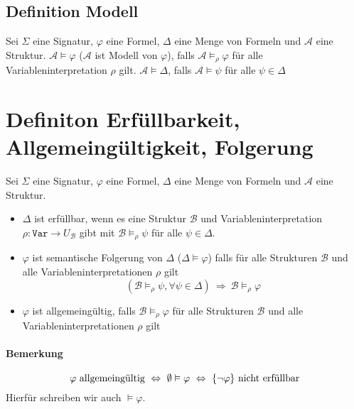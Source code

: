 \documentclass[12pt,a4paper]{report}
\newcommand{\ra}{\rightarrow}
\newcommand{\RA}{\Rightarrow}
\newcommand{\red}[1]{\textcolor[rgb]{0.9,0.2,0.2}{#1}}
\newcommand{\blue}[1]{\textcolor[rgb]{0.2,0.2,1}{#1}}
\begin{document}
\subsection{\blue{Definition Modell}}
Sei $ \Sigma $ eine Signatur, $ \varphi $ eine Formel, $ \Delta $ eine Menge von Formeln und $ \mathcal{A} $ eine Struktur.\newline
\red{$ \mathcal{A} \vDash \varphi $} ($ \mathcal{A} $ ist \red{Modell} von $ \varphi $), falls $ \mathcal{A} \vDash_\rho \varphi $ für alle Variableninterpretation $ \rho $ gilt.\newline
\red{$ \mathcal{A} \vDash \Delta $}, falls  $ \mathcal{A} \vDash \psi $ für alle $ \psi \in \Delta $

\section{\blue{Definiton Erfüllbarkeit, Allgemeingültigkeit, Folgerung}}
Sei $ \Sigma $ eine Signatur, $ \varphi $ eine Formel, $ \Delta $ eine Menge von Formeln und $ \mathcal{A} $ eine Struktur.
\begin{itemize}
    \item $ \Delta $ ist \red{erfüllbar}, wenn es eine Struktur $ \mathcal{B} $ und Variableninterpretation $ \rho: \texttt{Var} \ra U_\mathcal{B} $ gibt mit $ \mathcal{B} \vDash_\rho \psi$ für alle $ \psi \in \Delta $.
    \item $ \varphi $ ist \red{semantische Folgerung} von $ \Delta $ (\red{$ \Delta \vDash \varphi $}) falls für alle Strukturen $ \mathcal{B} $ und alle Variableninterpretationen $ \rho $ gilt
    \[
        (\mathcal{B} \vDash_\rho \psi, \forall \psi \in \Delta) ~\RA~ \mathcal{B} \vDash_\rho \varphi
    \]
    \item $ \varphi $ ist \red{allgemeingültig}, falls $ \mathcal{B} \vDash_\rho \varphi $ für alle Strukturen $ \mathcal{B} $ und alle Variableninterpretationen $ \rho $ gilt
\end{itemize}
\paragraph{Bemerkung}
\[
    \varphi \textnormal{ allgemeingültig} ~\Leftrightarrow~ \emptyset \vDash \varphi ~\Leftrightarrow~ \{\lnot \varphi\} \textnormal{ nicht erfüllbar}
\]
Hierfür schreiben wir auch $ \vDash \varphi $.
\end{document}
